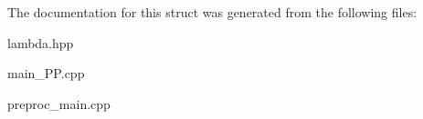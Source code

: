 The documentation for this struct was generated from the following files\+:\begin{DoxyCompactItemize}
\item 
lambda.\+hpp\item 
main\+\_\+\+P\+P.\+cpp\item 
preproc\+\_\+main.\+cpp\end{DoxyCompactItemize}
